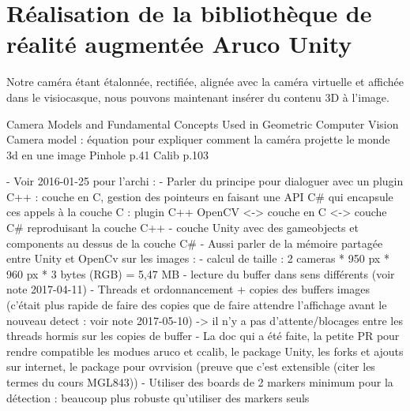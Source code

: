 \section{Réalisation de la bibliothèque de réalité augmentée Aruco Unity}
\label{sec:aruco_unity}

Notre caméra étant étalonnée, rectifiée, alignée avec la caméra virtuelle et affichée dans le visiocasque, nous pouvons maintenant insérer du contenu 3D à l'image.

Camera Models and Fundamental Concepts Used in Geometric Computer Vision
Camera model : équation pour expliquer comment la caméra projette le monde 3d en une image
Pinhole p.41
Calib p.103

- Voir 2016-01-25 pour l'archi :
  - Parler du principe pour dialoguer avec un plugin C++ : couche en C, gestion des pointeurs en faisant une API C\# qui encapsule ces appels à la couche C : plugin C++ OpenCV <-> couche en C <-> couche C\# reproduisant la couche C++ 
  - couche Unity avec des gameobjects et components au dessus de la couche C\#
- Aussi parler de la mémoire partagée entre Unity et OpenCv sur les images :
  - calcul de taille : 2 cameras * 950 px * 960 px * 3 bytes (RGB) = 5,47 MB
  - lecture du buffer dans sens différents (voir note 2017-04-11)
  - Threads et ordonnancement + copies des buffers images (c'était plus rapide de faire des copies que de faire attendre l'affichage avant le nouveau detect : voir note 2017-05-10) -> il n'y a pas d'attente/blocages entre les threads hormis sur les copies de buffer
- La doc qui a été faite, la petite PR pour rendre compatible les modues aruco et ccalib, le package Unity, les forks et ajouts sur internet, le package pour ovrvision (preuve que c'est extensible (citer les termes du cours MGL843))
- Utiliser des boards de 2 markers minimum pour la détection : beaucoup plus robuste qu'utiliser des markers seuls


